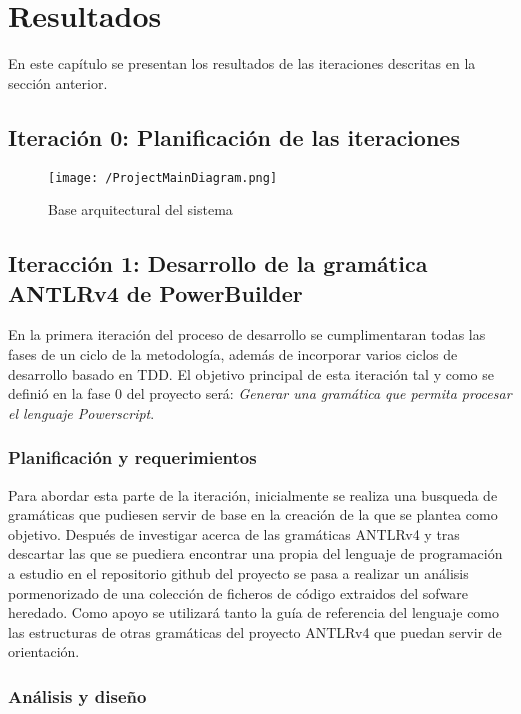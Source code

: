 \chapter{Resultados}
\label{chap:Resultados}
En este capítulo se presentan los resultados de las iteraciones descritas en la sección anterior.
\section{Iteración 0: Planificación de las iteraciones}
\begin{figure}[!h]
\begin{center}
\texttt{[image: /ProjectMainDiagram.png]}
\caption{Base arquitectural del sistema}
\label{fig:base-architecture}
\end{center}
\end{figure}
\section{Iteracción 1: Desarrollo de la gramática ANTLRv4 de PowerBuilder}

En la primera iteración del proceso de desarrollo se cumplimentaran todas las fases de un ciclo de la metodología, además de 
incorporar varios ciclos de desarrollo basado en TDD. El objetivo principal de esta iteración tal y como se definió en 
la fase 0 del proyecto será: \emph{Generar una gramática que permita procesar el lenguaje Powerscript}.

\subsection{Planificación y requerimientos}

Para abordar esta parte de la iteración, inicialmente se realiza una busqueda de gramáticas que pudiesen servir de base 
en la creación de la que se plantea como objetivo. Después de investigar acerca de las gramáticas ANTLRv4 y tras descartar
las que se puediera encontrar una propia del lenguaje de programación a estudio en el repositorio github del proyecto\cite{}
se pasa a realizar un análisis pormenorizado de una colección de ficheros de código extraidos del sofware heredado. 
Como apoyo se utilizará tanto la guía de referencia del lenguaje \cite{PowerBuilder} como las estructuras de otras gramáticas del proyecto
ANTLRv4 que puedan servir de orientación.

\subsection{Análisis y diseño}

